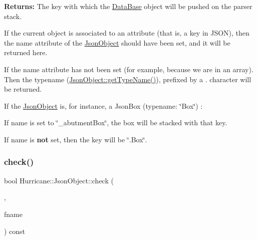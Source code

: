 {\bfseries Returns\+:} The key with which the \hyperlink{classHurricane_1_1DataBase}{Data\+Base} object will be pushed on the parser stack.

If the current object is associated to an attribute (that is, a key in J\+S\+ON), then the {\ttfamily name} attribute of the \hyperlink{classHurricane_1_1JsonObject}{Json\+Object} should have been set, and it will be returned here.

If the {\ttfamily name} attribute has not been set (for example, because we are in an array). Then the typename (\hyperlink{classHurricane_1_1JsonObject_a947e1c3f8dbae63bb2d086b5b827a2a5}{Json\+Object\+::get\+Type\+Name()}), prefixed by a {\ttfamily \textquotesingle{}}.\textquotesingle{} character will be returned.

If the \hyperlink{classHurricane_1_1JsonObject}{Json\+Object} is, for instance, a Json\+Box (typename\+: {\ttfamily \char`\"{}\+Box\char`\"{}}) \+:
\begin{DoxyItemize}
\item If {\ttfamily name} is set to {\ttfamily \char`\"{}\+\_\+abutment\+Box\char`\"{}}, the box will be stacked with that key.
\item If {\ttfamily name} is {\bfseries not} set, then the key will be {\ttfamily \char`\"{}.\+Box\char`\"{}}. 
\end{DoxyItemize}\mbox{\label{classHurricane_1_1JsonObject_a6ac9230d36590f83fbe1561b6c1bb0e5}} 
\subsubsection{\texorpdfstring{check()}{check()}}
{\footnotesize\ttfamily bool Hurricane\+::\+Json\+Object\+::check (\begin{DoxyParamCaption}\item[{\hyperlink{classHurricane_1_1JsonStack}{Json\+Stack} \&}]{,  }\item[{std\+::string}]{fname }\end{DoxyParamCaption}) const}


